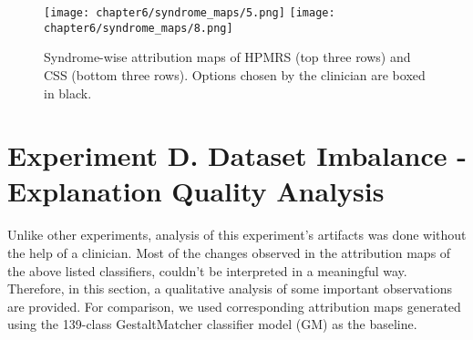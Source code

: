 \documentclass[../report.tex]{subfiles}
\begin{document}
            \begin{sidewaysfigure}
    	\texttt{[image: chapter6/syndrome\_maps/5.png]}
    	    	\texttt{[image: chapter6/syndrome\_maps/8.png]}
    	
    	\caption[Syndrome-wise attribution maps of HPMRS and CSS]{Syndrome-wise attribution maps of HPMRS (top three rows) and CSS (bottom three rows). Options chosen by the clinician are boxed in black.}
    	\label{fig_synd_map_2}	
    \end{sidewaysfigure}
    \clearpage
	\section{Experiment D. Dataset Imbalance - Explanation Quality Analysis}
	 Unlike other experiments, analysis of this experiment's artifacts was done without the help of a clinician. 	 Most of the changes observed in the attribution maps of the above listed classifiers, couldn't be interpreted in a meaningful way. Therefore, in this section, a qualitative analysis of some important observations are provided. For comparison, we used corresponding attribution maps generated using the 139-class GestaltMatcher classifier model (GM) as the baseline.
	 	
\end{document}
